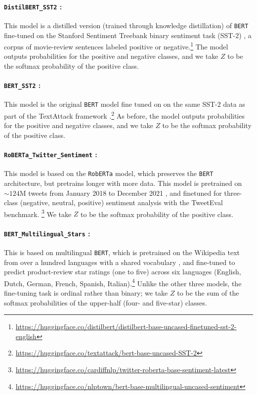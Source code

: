\documentclass[11pt]{article}
\numberwithin{equation}{section}
\theoremstyle{definition}
\begin{document}
\paragraph{\texttt{DistilBERT\_SST2} :} This model is a distilled version (trained through knowledge distillation) of \texttt{BERT} \citep{sanh2019distilbert} fine-tuned on the Stanford Sentiment Treebank binary sentiment task (SST-2) \citep{socher2013recursive}, a corpus of movie-review sentences labeled positive or negative.\footnote{\url{https://huggingface.co/distilbert/distilbert-base-uncased-finetuned-sst-2-english}} The model outputs probabilities for the positive and negative classes, and we take $Z$ to be the softmax probability of the positive class.

\paragraph{\texttt{BERT\_SST2} :} This model is the original \texttt{BERT} model fine tuned on on the same SST-2 data
\citep{socher2013recursive} as part of the TextAttack framework \citep{morris2020textattack}.\footnote{\url{https://huggingface.co/textattack/bert-base-uncased-SST-2}} As before, the model outputs probabilities for the positive and negative classes, and we take $Z$ to be the softmax probability of the positive class.

\paragraph{\texttt{RoBERTa\_Twitter\_Sentiment} :} This model is based on the \texttt{RobERTa} \citep{liu2019roberta} model, which preserves the \texttt{BERT} architecture, but pretrains longer with more data. This model is pretrained on $\sim124$M tweets from January 2018 to December 2021 \citep{loureiro2022timelms}, and finetuned for three-class
(negative, neutral, positive) sentiment analysis with the TweetEval benchmark.\citep{barbieri2020tweeteval} \footnote{\url{https://huggingface.co/cardiffnlp/twitter-roberta-base-sentiment-latest}} We take $Z$ to be the softmax probability of the positive class.

\paragraph{\texttt{{BERT\_Multilingual\_Stars}} :} This is based on multilingual \texttt{BERT}, which is pretrained on the Wikipedia text from over a hundred languages with a shared vocabulary \citep{devlin2019bert, pires2019multilingual}, and fine-tuned to predict product-review star ratings (one to five) across six languages (English, Dutch, German, French, Spanish, Italian).\footnote{\url{https://huggingface.co/nlptown/bert-base-multilingual-uncased-sentiment}} Unlike the other three models, the fine-tuning task is ordinal rather than binary; we take $Z$ to be the sum of the softmax probabilities of the upper-half (four- and five-star) classes.
\end{document}
